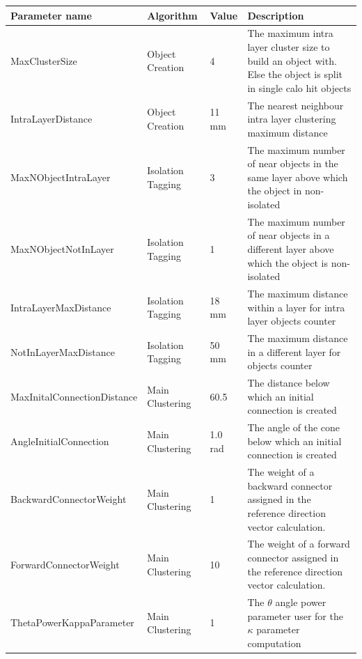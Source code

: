 \documentclass[cits]{JINST}
\begin{document}
\begin{center}  
  \begin{table}[!ht]
    \begin{tabu} to \linewidth {| l | X | l | X |} 
          \hline
          Parameter name & Algorithm & Value & Description \\ 
          \hline \hline
          MaxClusterSize & Object Creation & 4 & The maximum intra layer cluster size to build an object with. Else the object is split in single calo hit objects \\ 
          \hline
          IntraLayerDistance & Object Creation & 11 mm & The nearest neighbour intra layer clustering maximum distance \\
          \hline
           MaxNObjectIntraLayer & Isolation Tagging & 3 & The maximum number of near objects in the same layer above which the object in non-isolated \\
          \hline
          MaxNObjectNotInLayer & Isolation Tagging & 1 & The maximum number of near objects in a different layer above which the object is non-isolated \\ \hline
          IntraLayerMaxDistance & Isolation Tagging & 18 mm & The maximum distance within a layer for intra layer objects counter \\ 
          \hline
          NotInLayerMaxDistance & Isolation Tagging & 50 mm & The maximum distance in a different layer for objects counter \\
          \hline
          MaxInitalConnectionDistance & Main Clustering & 60.5 & The distance below which an initial connection is created \\
          \hline
          AngleInitialConnection & Main Clustering & 1.0 rad & The angle of the cone below which an initial connection is created \\
          \hline
          BackwardConnectorWeight & Main Clustering & 1 & The weight of a backward connector assigned in the reference direction vector calculation. \\
          \hline
          ForwardConnectorWeight & Main Clustering & 10 & The weight of a forward connector assigned in the reference direction vector calculation. \\
          \hline   
          ThetaPowerKappaParameter & Main Clustering & 1 & The $\theta$ angle power parameter user for the $\kappa$ parameter computation \\
          \hline
    \end{tabu}    
  \end{table}

\end{center}
\end{document}

